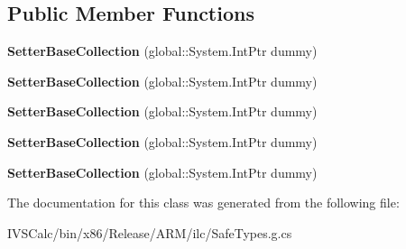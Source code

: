 \subsection*{Public Member Functions}
\begin{DoxyCompactItemize}
\item 
\mbox{\label{class_windows_1_1_u_i_1_1_xaml_1_1_setter_base_collection_aea17a8aa680285ba4a0ca60c74a716fa}} 
{\bfseries Setter\+Base\+Collection} (global\+::\+System.\+Int\+Ptr dummy)
\item 
\mbox{\label{class_windows_1_1_u_i_1_1_xaml_1_1_setter_base_collection_aea17a8aa680285ba4a0ca60c74a716fa}} 
{\bfseries Setter\+Base\+Collection} (global\+::\+System.\+Int\+Ptr dummy)
\item 
\mbox{\label{class_windows_1_1_u_i_1_1_xaml_1_1_setter_base_collection_aea17a8aa680285ba4a0ca60c74a716fa}} 
{\bfseries Setter\+Base\+Collection} (global\+::\+System.\+Int\+Ptr dummy)
\item 
\mbox{\label{class_windows_1_1_u_i_1_1_xaml_1_1_setter_base_collection_aea17a8aa680285ba4a0ca60c74a716fa}} 
{\bfseries Setter\+Base\+Collection} (global\+::\+System.\+Int\+Ptr dummy)
\item 
\mbox{\label{class_windows_1_1_u_i_1_1_xaml_1_1_setter_base_collection_aea17a8aa680285ba4a0ca60c74a716fa}} 
{\bfseries Setter\+Base\+Collection} (global\+::\+System.\+Int\+Ptr dummy)
\end{DoxyCompactItemize}


The documentation for this class was generated from the following file\+:\begin{DoxyCompactItemize}
\item 
I\+V\+S\+Calc/bin/x86/\+Release/\+A\+R\+M/ilc/Safe\+Types.\+g.\+cs\end{DoxyCompactItemize}
